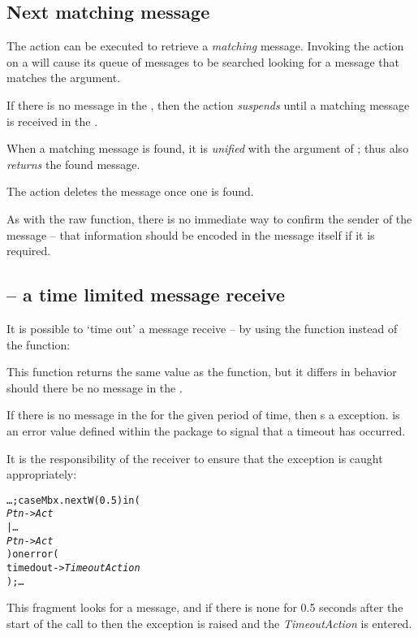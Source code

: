 \subsection{Next matching message}
\label{action:msg}


The  action can be executed to retrieve a \emph{matching} message. Invoking the  action on a  will cause its queue of messages to be searched looking for a message that matches the argument.

If there is no message in the , then the  action \emph{suspends} until a matching message is received in the .

When a matching message is found, it is \emph{unified} with the argument of ; thus  also \emph{returns} the found message.

The  action deletes the message once one is found.

As with the raw  function, there is no immediate way to confirm the sender of the message -- that information should be encoded in the message itself if it is required.

\subsection{ -- a time limited message receive}

It is possible to `time out' a message receive -- by using the  function instead of the  function:


This function returns the same value as the  function, but it differs in behavior should there be no message in the . 

If there is no message in the  for the given period of time, then  s a  exception.  is an error value defined within the  package to signal that a timeout has occurred.

It is the responsibility of the receiver to ensure that the  exception is caught appropriately:
\begin{alltt}
\ldots;case Mbx.nextW(0.5) in (
  \emph{Ptn} -> \emph{Act}
| \ldots{}
  \emph{Ptn} -> \emph{Act}
) onerror (
  timedout -> \emph{TimeoutAction}
  );\ldots
\end{alltt}
This fragment looks for a message, and if there is none for 0.5 seconds after the start of the call to  then the  exception is raised and the \emph{TimeoutAction} is entered.

